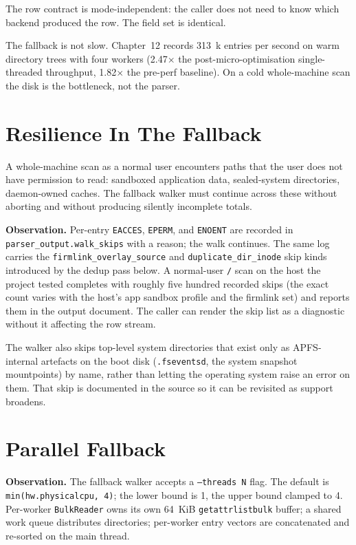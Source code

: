 The row contract is mode-independent: the caller does not need
to know which backend produced the row. The field set is
identical.

The fallback is not slow. Chapter~12 records 313~k entries per
second on warm directory trees with four workers
(2.47$\times$ the post-micro-optimisation single-threaded
throughput, 1.82$\times$ the pre-perf baseline). On a cold
whole-machine scan the disk is the bottleneck, not the parser.

\section{Resilience In The Fallback}

A whole-machine scan as a normal user encounters paths that the
user does not have permission to read: sandboxed application data,
sealed-system directories, daemon-owned caches. The fallback walker
must continue across these without aborting and without producing
silently incomplete totals.

\textbf{Observation.} Per-entry \texttt{EACCES}, \texttt{EPERM}, and
\texttt{ENOENT} are recorded in \texttt{parser\_output.walk\_skips}
with a reason; the walk continues. The same log carries the
\texttt{firmlink\_overlay\_source} and \texttt{duplicate\_dir\_inode}
skip kinds introduced by the dedup pass below. A normal-user
\texttt{/} scan on the host the project tested completes with
roughly five hundred recorded skips (the exact count varies with
the host's app sandbox profile and the firmlink set) and reports
them in the output document. The caller can render the skip list
as a diagnostic without it affecting the row stream.

The walker also skips top-level system directories that exist only as
APFS-internal artefacts on the boot disk
(\texttt{.fseventsd}, the system snapshot mountpoints) by name,
rather than letting the operating system raise an error on them.
That skip is documented in the source so it can be revisited as
support broadens.

\section{Parallel Fallback}

\textbf{Observation.} The fallback walker accepts a
\texttt{--threads N} flag. The default is
\texttt{min(hw.physicalcpu, 4)}; the lower bound is 1, the upper
bound clamped to 4. Per-worker \texttt{BulkReader} owns its own
64~KiB \texttt{getattrlistbulk} buffer; a shared work queue
distributes directories; per-worker entry vectors are
concatenated and re-sorted on the main thread.

